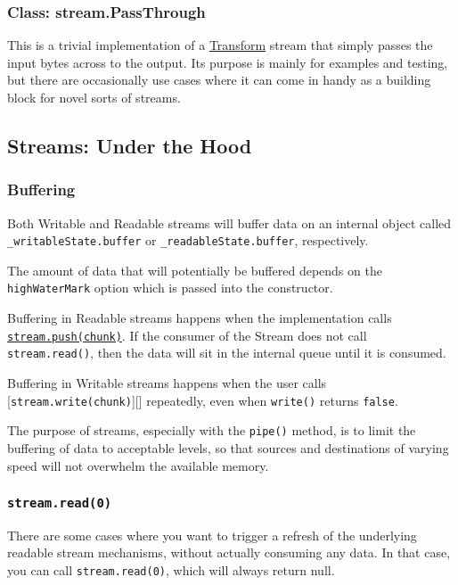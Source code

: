 \subsubsection{Class: stream.PassThrough}

This is a trivial implementation of a
\hyperref[stream\_class\_stream\_transform]{Transform} stream that
simply passes the input bytes across to the output. Its purpose is
mainly for examples and testing, but there are occasionally use cases
where it can come in handy as a building block for novel sorts of
streams.

\subsection{Streams: Under the Hood}

\subsubsection{Buffering}

Both Writable and Readable streams will buffer data on an internal
object called \texttt{\_writableState.buffer} or
\texttt{\_readableState.buffer}, respectively.

The amount of data that will potentially be buffered depends on the
\texttt{highWaterMark} option which is passed into the constructor.

Buffering in Readable streams happens when the implementation calls
\hyperref[stream\_readable\_push\_chunk\_encoding]{\texttt{stream.push(chunk)}}.
If the consumer of the Stream does not call \texttt{stream.read()}, then
the data will sit in the internal queue until it is consumed.

Buffering in Writable streams happens when the user calls
{[}\texttt{stream.write(chunk)}{]}{[}{]} repeatedly, even when
\texttt{write()} returns \texttt{false}.

The purpose of streams, especially with the \texttt{pipe()} method, is
to limit the buffering of data to acceptable levels, so that sources and
destinations of varying speed will not overwhelm the available memory.

\subsubsection{\texttt{stream.read(0)}}

There are some cases where you want to trigger a refresh of the
underlying readable stream mechanisms, without actually consuming any
data. In that case, you can call \texttt{stream.read(0)}, which will
always return null.

